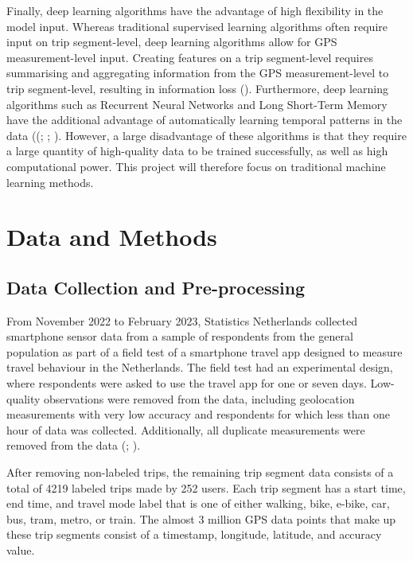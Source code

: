 \documentclass[10pt, a4paper, titlepage, hidelinks]{article}
\begin{document}
Finally, deep learning algorithms have the advantage of high flexibility in the model input. Whereas traditional supervised learning algorithms often require input on trip segment-level, deep learning algorithms allow for GPS measurement-level input. Creating features on a trip segment-level requires summarising and aggregating information from the GPS measurement-level to trip segment-level, resulting in information loss (\cite{yang2024}). Furthermore, deep learning algorithms such as Recurrent Neural Networks and Long Short-Term Memory have the additional advantage of automatically learning temporal patterns in the data ((\cite{jiang2023}; \cite{yu2021}; \cite{qin2019}). However, a large disadvantage of these algorithms is that they require a large quantity of high-quality data to be trained successfully, as well as high computational power. This project will therefore focus on traditional machine learning methods.

\section{Data and Methods}

\subsection{Data Collection and Pre-processing}

From November 2022 to February 2023, Statistics Netherlands collected smartphone sensor data from a sample of respondents from the general population as part of a field test of a smartphone travel app designed to measure travel behaviour in the Netherlands. The field test had an experimental design, where respondents were asked to use the travel app for one or seven days. Low-quality observations were removed from the data, including geolocation measurements with very low accuracy and respondents for which less than one hour of data was collected. Additionally, all duplicate measurements were removed from the data (\cite{Schouten2024}; \cite{gootzen2025}). 

After removing non-labeled trips, the remaining trip segment data consists of a total of 4219 labeled trips made by 252 users. Each trip segment has a start time, end time, and travel mode label that is one of either walking, bike, e-bike, car, bus, tram, metro, or train. The almost 3 million GPS data points that make up these trip segments consist of a timestamp, longitude, latitude, and accuracy value.
\end{document}
